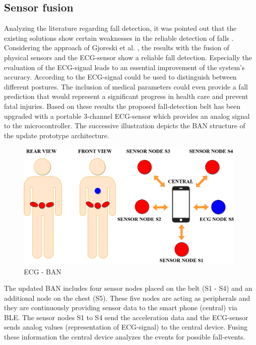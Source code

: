 \documentclass[review]{elsarticle}
\begin{document}
\subsection{Sensor fusion}
\label{subsec:sensorfusion}	
Analyzing the literature regarding fall detection, it was pointed out that the existing solutions show certain weaknesses in the reliable detection of falls \cite{Igual2013, Li2009, Luder2009, Pannurat2014, jamsa2014fall}. Considering the approach of Gjoreski et al. \cite{Gjoreski2014}, the results with the fusion of physical sensors and the ECG-sensor show a reliable fall detection. Especially the evaluation of the ECG-signal leads to an essential improvement of the system's accuracy.  According to \cite{Gjoreski2014} the ECG-signal could be used to distinguish between different postures. The inclusion of medical parameters could even provide a fall prediction that would represent a significant progress in health care and prevent fatal injuries. Based on these results the proposed fall-detection belt  has been upgraded with a portable 3-channel ECG-sensor which provides an analog signal to the microcontroller. The successive illustration depicts the BAN structure of the update prototype architecture.
\begin{figure}[!ht]
	\centering
	\includegraphics[scale=0.30]{Images/ECG-BAN.png}
	\caption[ECG - BAN]{ECG - BAN}
	\label{fig:ECGBAN}
\end{figure}
The updated BAN includes four sensor nodes placed on the belt (S1 - S4) and an additional node on the chest (S5). These five nodes are acting as peripherals and they are continuously providing sensor data to the smart phone (central) via BLE. The sensor nodes S1 to S4 send the acceleration data and the ECG-sensor sends analog values (representation of ECG-signal) to the central device. Fusing these information the central device analyzes the events for possible fall-events.
\end{document}
